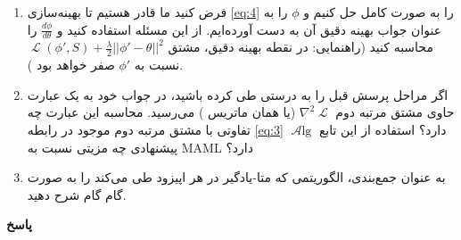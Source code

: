 \documentclass{article}
\DeclareMathOperator{\Loss}{\mathcal{L}}
\DeclareMathOperator{\Alg}{\mathcal{A}lg}
\begin{document}
\begin{enumerate}
\item
فرض کنید ما قادر هستیم تا بهینه‌سازی 
\ref{eq:4}
را به صورت کامل حل کنیم و 
$\phi$
را به عنوان جواب بهینه دقیق آن به دست آورده‌ایم. از این مسئله استفاده کنید و 
$\frac{d\phi}{d\theta}$
را محاسبه کنید (راهنمایی: در نقطه بهینه دقیق، مشتق 
$ \Loss(\phi', S) + \frac{\lambda}{2}||\phi' - \theta||^2$
نسبت به 
$\phi'$
صفر خواهد بود
).

\item
اگر مراحل پرسش قبل را به درستی طی کرده باشید، در جواب خود به یک عبارت حاوی مشتق مرتبه دوم $\nabla^2 \Loss$ (یا همان ماتریس 
)
می‌رسید. محاسبه این عبارت چه تفاوتی با مشتق مرتبه دوم موجود در رابطه 
\ref{eq:3}
دارد؟ استفاده از این تابع
$\Alg$
پیشنهادی چه مزیتی نسبت به MAML دارد؟

\item
به عنوان جمع‌بندی، الگوریتمی که متا-یادگیر در هر اپیزود طی می‌کند را به صورت گام گام شرح دهید.

\end{enumerate}

\textbf{پاسخ}
\end{document}
